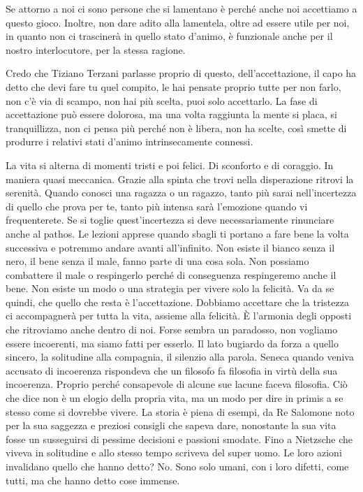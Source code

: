 \documentclass[12pt]{book} %
\begin{document}
\begin{mdframed}[linewidth=1pt]
Se attorno a noi ci sono persone che si lamentano è perché anche noi
accettiamo a questo gioco. Inoltre, non dare adito alla lamentela, oltre ad essere utile per noi, in quanto non ci
trascinerà in quello stato d'animo, è funzionale anche per il nostro interlocutore,
per la stessa ragione.
\end{mdframed}

Credo che Tiziano Terzani parlasse proprio di questo, dell'accettazione, il capo ha detto che devi
fare tu quel compito, le hai pensate proprio tutte per non farlo, non c'è via di scampo, non hai
più scelta, puoi solo accettarlo. La fase di accettazione può essere dolorosa, ma una volta raggiunta la mente si
placa, si tranquillizza, non ci pensa più perché non è libera, non ha scelte, così smette di produrre i relativi stati
d'animo intrinsecamente connessi.

La vita si alterna di momenti tristi e poi felici. Di sconforto e di coraggio. In maniera quasi meccanica. Grazie alla
spinta che trovi nella disperazione ritrovi la serenità. Quando conosci una ragazza o un ragazzo, tanto più sarai
nell'incertezza di quello che prova per te, tanto più intensa sarà l'emozione
quando vi frequenterete. Se si toglie quest'incertezza si deve necessariamente rinunciare anche al
pathos. Le lezioni apprese quando sbagli ti portano a fare bene la volta successiva e potremmo andare avanti
all'infinito. Non esiste il bianco senza il nero, il bene senza il male, fanno parte di una cosa
sola. Non possiamo combattere il male o respingerlo perché di conseguenza respingeremo anche il bene. Non esiste un
modo o una strategia per vivere solo la felicità. Va da se quindi, che quello che resta è
l'accettazione. Dobbiamo accettare che la tristezza ci accompagnerà per tutta la vita, assieme
alla felicità. È l'armonia degli opposti che ritroviamo anche dentro di noi. Forse sembra un
paradosso, non vogliamo essere incoerenti, ma siamo fatti per esserlo. Il lato bugiardo da forza a quello sincero, la
solitudine alla compagnia, il silenzio alla parola. Seneca quando veniva accusato di incoerenza rispondeva che un
filosofo fa filosofia in virtù della sua incoerenza. Proprio perché consapevole di alcune sue lacune faceva filosofia.
Ciò che dice non è un elogio della propria vita, ma un modo per dire in primis a se stesso come si dovrebbe vivere. La
storia è piena di esempi, da Re Salomone noto per la sua saggezza e preziosi consigli che sapeva dare, nonostante la
sua vita fosse un susseguirsi di pessime decisioni e passioni smodate. Fino a Nietzsche che viveva in solitudine e
allo stesso tempo scriveva del super uomo. Le loro azioni invalidano quello che hanno detto? No. Sono solo umani, con i
loro difetti, come tutti, ma che hanno detto cose immense.
\end{document}
